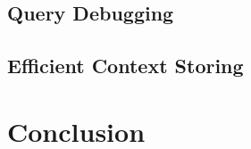 \documentclass[runningheads]{llncs}
\begin{document}
\subsection{Query Debugging}
\subsection{Efficient Context Storing}

\section{Conclusion} \label{sec:CONCLUSION}



\end{document}
